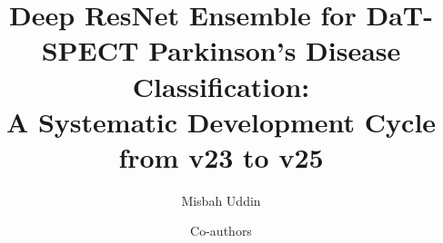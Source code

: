 \title{Deep ResNet Ensemble for DaT-SPECT Parkinson's Disease Classification:\\A Systematic Development Cycle from v23 to v25}

\author{Misbah Uddin}

\author{Co-authors}
